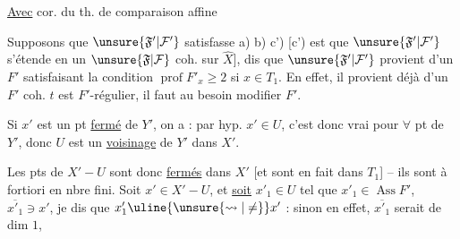 

\uline{Avec} cor.  du th. de comparaison affine

Supposons que $\unsure{\mathfrak F'|\mathcal F'}$ satisfasse a) b) c')
[c') est que $\unsure{\mathfrak F'|\mathcal F'}$ s'étende en un
$\unsure{\mathfrak F|\mathcal F}$ coh. sur $\hat X$], 
dis que $\unsure{\mathfrak F'|\mathcal F'}$ provient d'un $F'$ satisfaisant la
condition $\operatorname{prof}F'_x\ge2$ si $x\in T_1$.
En effet,
il provient déjà d'un $F'$ coh. 
$t$ est $F'$-régulier, il faut au besoin modifier $F'$.




Si $x'$ est
un pt \uline{fermé} de  $Y'$, on a : par hyp.
$x'\in U$, c'est donc vrai pour $\forall$ pt de $Y'$,
donc $U$ est un \uline{voisinage} de $Y'$ dans $X'$.

Les pts de $X'-U$ sont donc \uline{fermés} dans $X'$
[et sont en fait dans $T_1$] -- ils sont à
fortiori en nbre fini. Soit $x'\in X'-U$, et
\uline{soit} 
$x'_1\in U$ tel que $x'_1\in\operatorname{Ass}F'$,
$\overline{x'_1}\ni x'$, je dis que 
$x'_1\uline{\unsure{\rightsquigarrow|\ne}}x'$ : sinon en effet, $\overline{x'_1}$ serait de dim $1$,

